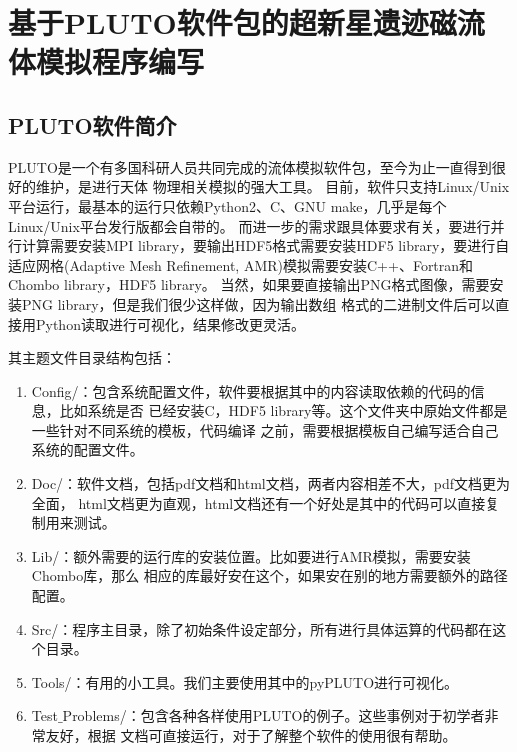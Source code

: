 \chapter{基于PLUTO软件包的超新星遗迹磁流体模拟程序编写}
\label{PLUTO}



\section{PLUTO软件简介}
\label{PLUTOintro}
PLUTO是一个有多国科研人员共同完成的流体模拟软件包，至今为止一直得到很好的维护，是进行天体
物理相关模拟的强大工具\citep{Mignone2007,Mignone2012}。
目前，软件只支持Linux/Unix平台运行，最基本的运行只依赖Python2、C、GNU make，几乎是每个
Linux/Unix平台发行版都会自带的。
而进一步的需求跟具体要求有关，要进行并行计算需要安装MPI library，要输出HDF5格式需要安装HDF5
library，要进行自适应网格(Adaptive Mesh Refinement, AMR)模拟需要安装C++、Fortran和
Chombo library，HDF5 library。
当然，如果要直接输出PNG格式图像，需要安装PNG library，但是我们很少这样做，因为输出数组
格式的二进制文件后可以直接用Python读取进行可视化，结果修改更灵活。

其主题文件目录结构包括：

\begin{enumerate}

    \item Config/：包含系统配置文件，软件要根据其中的内容读取依赖的代码的信息，比如系统是否
    已经安装C，HDF5 library等。这个文件夹中原始文件都是一些针对不同系统的模板，代码编译
    之前，需要根据模板自己编写适合自己系统的配置文件。

    \item Doc/：软件文档，包括pdf文档和html文档，两者内容相差不大，pdf文档更为全面，
    html文档更为直观，html文档还有一个好处是其中的代码可以直接复制用来测试。

    \item Lib/：额外需要的运行库的安装位置。比如要进行AMR模拟，需要安装Chombo库，那么
    相应的库最好安在这个，如果安在别的地方需要额外的路径配置。

    \item Src/：程序主目录，除了初始条件设定部分，所有进行具体运算的代码都在这个目录。

    \item Tools/：有用的小工具。我们主要使用其中的pyPLUTO进行可视化。

    \item Test$\_$Problems/：包含各种各样使用PLUTO的例子。这些事例对于初学者非常友好，根据
    文档可直接运行，对于了解整个软件的使用很有帮助。

\end{enumerate}

